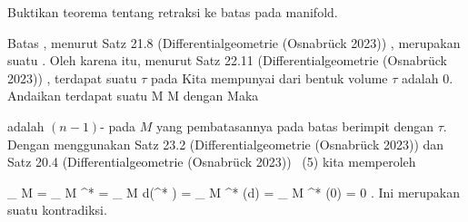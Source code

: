 {

Buktikan teorema tentang retraksi ke batas pada manifold.

}
{

Batas
, menurut
Satz 21.8 (Differentialgeometrie (Osnabrück 2023))
, merupakan suatu
 {} {.}
Oleh karena itu, menurut
Satz 22.11 (Differentialgeometrie (Osnabrück 2023))
, terdapat suatu
$\tau$ pada
 Kita mempunyai
dari bentuk volume $\tau$ adalah $0$. Andaikan terdapat suatu
\maabbdisp {\varphi} { M } { \partial M
} {}
dengan
 Maka

\mathl{\varphi^* \tau}{} adalah
$(n-1)$-
pada $M$ yang pembatasannya pada batas berimpit dengan $\tau$. Dengan menggunakan
Satz 23.2 (Differentialgeometrie (Osnabrück 2023))
dan
Satz 20.4 (Differentialgeometrie (Osnabrück 2023))  (5)
kita memperoleh

\mavergleichskettealign
{\vergleichskettealign
{
\int_{  \partial M  }  \tau
}
{ =} {
\int_{  \partial  M  }  \varphi^* \tau
}
{ =} {
\int_{   M  }  d(\varphi^* \tau)
}
{ =} {
\int_{   M  }  \varphi^* (d\tau)
}
{ =} {
\int_{   M  }  \varphi^* (0)
}
}
{
\vergleichskettefortsetzungalign
{ =} { 0
}
{ } {}
{ } {}
{ } {}
}
{}{.}
Ini merupakan suatu kontradiksi.

 }
